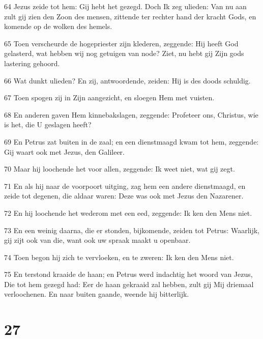 \par 64 Jezus zeide tot hem: Gij hebt het gezegd. Doch Ik zeg ulieden: Van nu aan zult gij zien den Zoon des mensen, zittende ter rechter hand der kracht Gods, en komende op de wolken des hemels.
\par 65 Toen verscheurde de hogepriester zijn klederen, zeggende: Hij heeft God gelasterd, wat hebben wij nog getuigen van node? Ziet, nu hebt gij Zijn gods lastering gehoord.
\par 66 Wat dunkt ulieden? En zij, antwoordende, zeiden: Hij is des doods schuldig.
\par 67 Toen spogen zij in Zijn aangezicht, en sloegen Hem met vuisten.
\par 68 En anderen gaven Hem kinnebakslagen, zeggende: Profeteer ons, Christus, wie is het, die U geslagen heeft?
\par 69 En Petrus zat buiten in de zaal; en een dienstmaagd kwam tot hem, zeggende: Gij waart ook met Jezus, den Galileer.
\par 70 Maar hij loochende het voor allen, zeggende: Ik weet niet, wat gij zegt.
\par 71 En als hij naar de voorpoort uitging, zag hem een andere dienstmaagd, en zeide tot degenen, die aldaar waren: Deze was ook met Jezus den Nazarener.
\par 72 En hij loochende het wederom met een eed, zeggende: Ik ken den Mens niet.
\par 73 En een weinig daarna, die er stonden, bijkomende, zeiden tot Petrus: Waarlijk, gij zijt ook van die, want ook uw spraak maakt u openbaar.
\par 74 Toen begon hij zich te vervloeken, en te zweren: Ik ken den Mens niet.
\par 75 En terstond kraaide de haan; en Petrus werd indachtig het woord van Jezus, Die tot hem gezegd had: Eer de haan gekraaid zal hebben, zult gij Mij driemaal verloochenen. En naar buiten gaande, weende hij bitterlijk.

\chapter{27}


